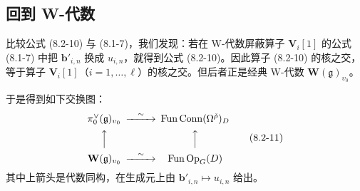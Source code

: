 
\subsection{回到 W-代数}

比较公式 (8.2-10) 与 (8.1-7)，我们发现：若在 W-代数屏蔽算子 $\mathbf V_i[1]$ 的公式 (8.1-7) 中把 $\mathbf b'_{i,n}$ 换成 $u_{i,n}$，就得到公式 (8.2-10)。因此算子 (8.2-10) 的核之交，等于算子 $\mathbf V_i[1]$（$i=1,\dots,\ell$）的核之交。但后者正是经典 W-代数 $\mathbf W(\mathfrak g)_{\upsilon_0}$。

于是得到如下交换图：
\begin{equation}
\begin{CD}
\pi^\vee_0(\mathfrak g)_{\upsilon_0} @>{\sim}>> \operatorname{Fun}\operatorname{Conn}(\Omega^{\check\rho})_D\\
@AAA @AAA\\
\mathbf W(\mathfrak g)_{\upsilon_0} @>{\sim}>> \operatorname{Fun}\operatorname{Op}_G(D)
\end{CD}
\tag{8.2-11}
\end{equation}
其中上箭头是代数同构，在生成元上由 $\mathbf b'_{i,n}\mapsto u_{i,n}$ 给出。

